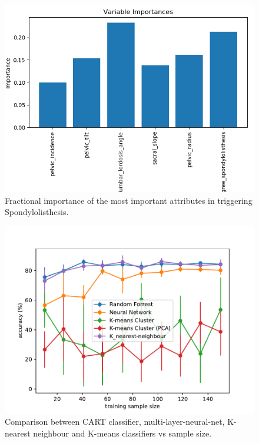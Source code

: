 \documentclass[10pt]{article}
\begin{document}
\begin{figure}
\begin{center}
\includegraphics[scale=0.8,angle=0,trim=0cm 0cm 0cm 0cm]{importances_0_0.png}
\caption{Fractional importance of the most important attributes in triggering Spondylolisthesis.}
\label{fig_import}
\end{center}
\end{figure} 



\begin{figure}
\begin{center}
\includegraphics[scale=0.4,angle=0,trim=8cm 0cm 0cm 0cm]{comparison_accuracy.pdf}
\caption{Comparison between CART classifier, multi-layer-neural-net, K-nearest neighbour and K-means classifiers vs sample size.}
\label{fig_comp}
\end{center}
\end{figure} 
\end{document}

